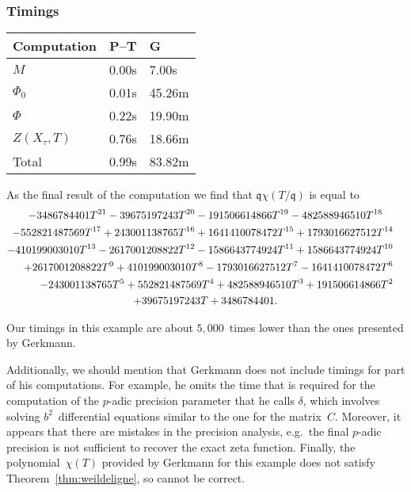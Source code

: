 \documentclass[a4paper,11pt]{article}
\numberwithin{equation}{section}
\theoremstyle{definition}
\begin{document}
\subsubsection{Timings}

\begin{center}
\begin{tabular}{l l l} \toprule
Computation     & P--T & G      \\ \midrule
$M$             & 0.00s& 7.00s      \\
$\Phi_0$        & 0.01s& 45.26m \\
$\Phi$          & 0.22s& 19.90m \\
$Z(X_{\tau},T)$ & 0.76s& 18.66m \\
Total           & 0.99s& 83.82m \\ \bottomrule
\end{tabular}
\end{center}

As the final result of the computation we find that 
$\mathfrak{q} \chi(T/\mathfrak{q})$ is equal to 
\begin{multline*}
-3486784401T^{21} - 39675197243T^{20} - 191506614866T^{19} - 482588946510T^{18} \\
\shoveright{-552821487569T^{17} + 243001138765T^{16} + 1641410078472T^{15} + 1793016627512T^{14}} \\
\shoveright{-410199003010T^{13} - 2617001208822T^{12} - 1586643774924T^{11} + 1586643774924T^{10}} \\
\shoveright{+2617001208822T^9 + 410199003010T^8 - 1793016627512T^7 - 1641410078472T^6} \\
\shoveright{-243001138765T^5+ 552821487569T^4 + 482588946510T^3 + 191506614866T^2} \\
+39675197243T + 3486784401.
\end{multline*}

Our timings in this example are about $5,000$~times lower than the ones 
presented by Gerkmann. 

Additionally, we should mention that Gerkmann does not include timings for part 
of his computations.  For example, he omits the time that is required for the 
computation of the $p$-adic precision parameter that he calls $\delta$, which 
involves solving $b^2$~differential equations similar to the one for the matrix~$C$. 
Moreover, it appears that there are mistakes in the precision analysis, e.g.\ 
the final $p$-adic precision is not sufficient to recover the exact zeta function. 
Finally, the polynomial~$\chi(T)$ provided by Gerkmann for this example does 
not satisfy Theorem~\ref{thm:weildeligne}, so cannot be correct.
\end{document}
